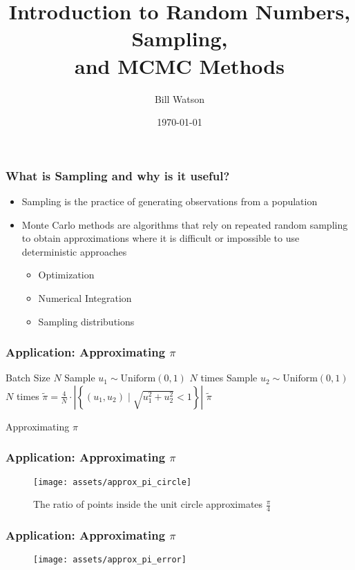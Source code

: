 \documentclass{beamer}
\title{Introduction to Random Numbers, Sampling,\\and MCMC Methods}
\author{Bill Watson}
\institute{S\&P Global}
\date{\today}
\begin{document}
\begin{frame}
\titlepage
\end{frame}


\begin{frame}
\frametitle{What is Sampling and why is it useful?}
\begin{itemize}
  \item Sampling is the practice of generating observations from a population
  \item Monte Carlo methods are algorithms that rely on repeated random sampling
    to obtain approximations where it is difficult or impossible to use deterministic approaches
    \begin{itemize}
      \item Optimization
      \item Numerical Integration
      \item Sampling distributions
    \end{itemize}
\end{itemize}
\end{frame}


\begin{frame}
\frametitle{Application: Approximating $\pi$}
\begin{algorithm}[H]
\begin{algorithmic}[1]
  \REQUIRE Batch Size $N$
  \STATE Sample $u_1 \sim \text{Uniform}(0, 1)$ $N$ times
  \STATE Sample $u_2 \sim \text{Uniform}(0, 1)$ $N$ times
  \STATE $\tilde{\pi} = \frac{4}{N} \cdot \left\vert \left\{ (u_1, u_2) \; \Big \vert \; \sqrt{u_1^2 + u_2^2} < 1 \right\} \right\vert$
  \ENSURE $\tilde{\pi}$
\end{algorithmic}
\caption{Approximating $\pi$}
\end{algorithm}
\end{frame}


\begin{frame}
  \frametitle{Application: Approximating $\pi$}
  \begin{figure}
    \centering
    \texttt{[image: assets/approx\_pi\_circle]}
    \caption{The ratio of points inside the unit circle approximates $\frac{\pi}{4}$}
  \end{figure}
\end{frame}


\begin{frame}
  \frametitle{Application: Approximating $\pi$}
  \begin{figure}
    \centering
    \texttt{[image: assets/approx\_pi\_error]}
  \end{figure}
\end{frame}
\end{document}

